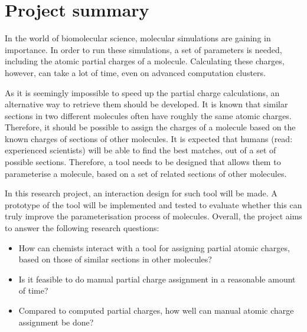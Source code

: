 \chapter{Project summary}

In the world of biomolecular science, molecular simulations are gaining in importance. In order to run these simulations, a set of parameters is needed, including the atomic partial charges of a molecule. Calculating these charges, however, can take a lot of time, even on advanced computation clusters.

As it is seemingly impossible to speed up the partial charge calculations, an alternative way to retrieve them should be developed. It is known that similar sections in two different molecules often have roughly the same atomic charges. Therefore, it should be possible to assign the charges of a molecule based on the known charges of sections of other molecules. It is expected that humans (read: experienced scientists) will be able to find the best matches, out of a set of possible sections. Therefore, a tool needs to be designed that allows them to parameterise a molecule, based on a set of related sections of other molecules. 

In this research project, an interaction design for such tool will be made. A prototype of the tool will be implemented and tested to evaluate whether this can truly improve the parameterisation process of molecules. Overall, the project aims to answer the following research questions:
\begin{itemize}
\item How can chemists interact with a tool for assigning partial atomic charges, based on those of similar sections in other molecules?
\item Is it feasible to do manual partial charge assignment in a reasonable amount of time?
\item Compared to computed partial charges, how well can manual atomic charge assignment be done?
\end{itemize}
